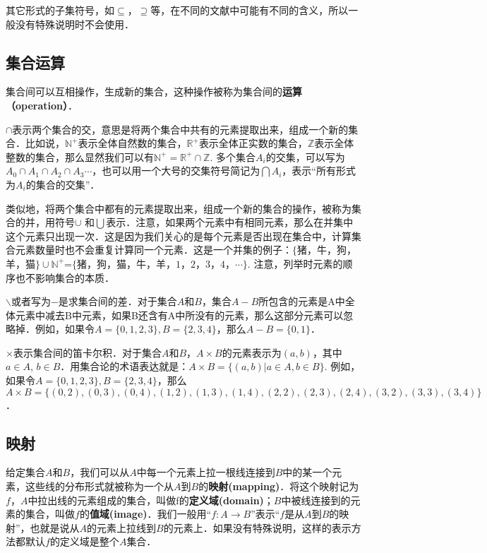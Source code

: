 其它形式的子集符号，如$⊆$，$\supseteq$等，在不同的文献中可能有不同的含义，所以一般没有特殊说明时不会使用．


\subsection{集合运算}

集合间可以互相操作，生成新的集合，这种操作被称为集合间的\textbf{运算（operation）}．

$∩$表示两个集合的交，意思是将两个集合中共有的元素提取出来，组成一个新的集合．比如说，$\mathbb{N^+}$表示全体自然数的集合，$\mathbb{R^+}$表示全体正实数的集合，$\mathbb{Z}$表示全体整数的集合，那么显然我们可以有$\mathbb{N^+}=\mathbb{R^+}∩\mathbb{Z}$. 多个集合$A_i$的交集，可以写为$A_0∩A_1∩A_2∩A_3⋯$，也可以用一个大号的交集符号简记为$⋂A_i$，表示“所有形式为$A_i$的集合的交集”．

类似地，将两个集合中都有的元素提取出来，组成一个新的集合的操作，被称为集合的并，用符号$∪$ 和$⋃$表示．注意，如果两个元素中有相同元素，那么在并集中这个元素只出现一次．这是因为我们关心的是每个元素是否出现在集合中，计算集合元素数量时也不会重复计算同一个元素．这是一个并集的例子：$\{$猪，牛，狗，羊，猫$\}∪\mathbb{N^+}$=$\{\text{猪，狗，猫，牛，羊}， 1，2，3，4，⋯\}$. 注意，列举时元素的顺序也不影响集合的本质．

$\backslash$或者写为$-$是求集合间的差．对于集合$A$和$B$，集合$A-B$所包含的元素是A中全体元素中减去B中元素，如果B还含有A中所没有的元素，那么这部分元素可以忽略掉．例如，如果令$A=\{0,1,2,3\}, B=\{2,3,4\}$，那么$A-B=\{0,1\}$．

$×$表示集合间的笛卡尔积．对于集合$A$和$B$，$A× B$的元素表示为$(a,b)$，其中$a∈ A$, $b∈ B$．用集合论的术语表达就是：$A× B=\{(a,b)|a∈ A, b∈ B\}$. 例如，如果令$A=\{0,1,2,3\}, B=\{2,3,4\}$，那么$A× B=\{ (0,2),(0,3),(0,4),(1,2),(1,3),(1,4),(2,2),(2,3),(2,4),(3,2),(3,3),(3,4) \}$．



\subsection{映射}


给定集合$A$和$B$，我们可以从$A$中每一个元素上拉一根线连接到$B$中的某一个元素，这些线的分布形式就被称为一个从$A$到$B$的\textbf{映射(mapping)}．将这个映射记为$f$，$A$中拉出线的元素组成的集合，叫做f的\textbf{定义域(domain)}；$B$中被线连接到的元素的集合，叫做$f$的\textbf{值域(image)}．我们一般用“$f:A\rightarrow B$”表示“$f$是从$A$到$B$的映射”，也就是说从$A$的元素上拉线到$B$的元素上．如果没有特殊说明，这样的表示方法都默认$f$的定义域是整个$A$集合．

